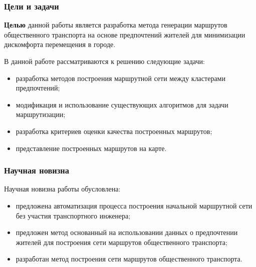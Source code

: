 \begin{frame}
    \frametitle{Цели и задачи}
    \textbf{Целью} данной работы является разработка метода генерации маршрутов общественного 
    транспорта на основе предпочтений жителей для минимизации дискомфорта перемещения в городе.

    В данной работе рассматриваются к решению следующие задачи:
    \begin{itemize}
        \item разработка методов построения маршрутной сети между кластерами предпочтений;
        \item модификация и использование существующих алгоритмов для задачи маршрутизации;
        \item разработка критериев оценки качества построенных маршрутов;
        \item представление построенных маршрутов на карте.
    \end{itemize}
\end{frame}

\begin{frame}
    \frametitle{Научная новизна}
    Научная новизна работы обусловлена:
    \begin{itemize}
        \item предложена автоматизация процесса построения начальной маршрутной сети без участия 
            транспортного инженера;
        \item предложен метод основанный на использовании данных о предпочтении жителей для построения 
            сети маршрутов общественного транспорта;
        \item разработан метод построения сети маршрутов общественного транспорта.
    \end{itemize}
\end{frame}

